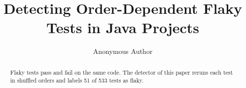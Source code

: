 \documentclass[acmsmall,screen]{acmart}
\begin{document}
\title{Detecting Order-Dependent Flaky Tests in Java Projects}
\author{Anonymous Author}
\begin{abstract}
Flaky tests pass and fail on the same code. The detector of this paper reruns each test in shuffled orders and
labels 51 of 533 tests as flaky.
\end{abstract}
\maketitle

\end{document}
